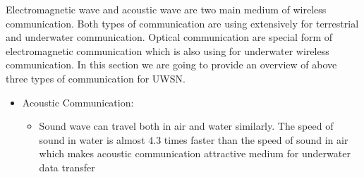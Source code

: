 \documentclass[11pt]{article}
\begin{document}
Electromagnetic wave and acoustic wave are two main medium of wireless communication. Both types of communication are using  extensively for terrestrial and underwater communication. Optical communication  are special form of electromagnetic communication which is also using for underwater wireless communication. In this section we are going to provide an overview of above three types of communication for UWSN.
\begin{itemize}
\item{Acoustic Communication:}
\begin{itemize}
\item  Sound wave can travel both in air and water similarly. The speed of sound in water is almost $4.3$ times faster than the speed of sound in air which makes acoustic communication attractive medium for underwater data transfer\cite{stojanovic2009underwater}\cite{stojanovic2008underwater}
\cite{proakis2001shallow}
 

\end{itemize}
\end{itemize}
\end{document}
